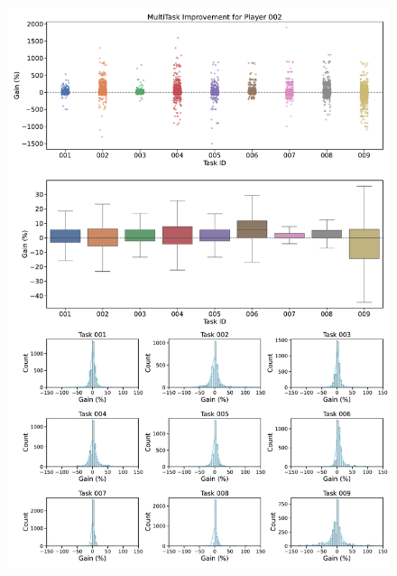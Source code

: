 \begin{figure}[ht]
  \centering
  \includegraphics[width=\textwidth]{figures/gain_validity/multitask/multitask_gain_player_00002.pdf}
\end{figure}
\clearpage

